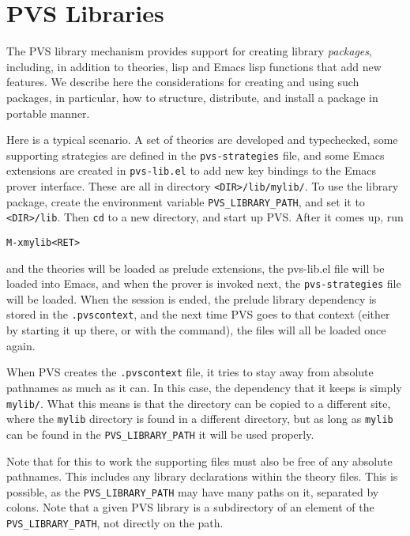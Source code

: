 \chapter{PVS Libraries}

The PVS library mechanism provides support for creating library
\emph{packages}, including, in addition to theories, lisp and Emacs lisp
functions that add new features.  We describe here the considerations for
creating and using such packages, in particular, how to structure, 
distribute, and install a package in portable manner.

Here is a typical scenario.  A set of theories are developed and
typechecked, some supporting strategies are defined in the
\texttt{pvs-strategies}
file, and some Emacs extensions are created in
\texttt{pvs-lib.el} to add new key
bindings to the Emacs prover interface.  These are all in directory
\texttt{<DIR>/lib/mylib/}.  To use the library package, create the
environment variable
\texttt{PVS\_LIBRARY\_PATH},
and set it to \texttt{<DIR>/lib}.  Then \texttt{cd} to a new directory,
and start up PVS.  After it comes up, run
\begin{alltt}
  M-x  mylib <RET>
\end{alltt}
and the theories will be loaded as prelude extensions, the pvs-lib.el file
will be loaded into Emacs, and when the prover is invoked next, the
\texttt{pvs-strategies} file will be loaded.  When the session is ended,
the prelude library dependency is stored in the \texttt{.pvscontext}, and
the next time PVS goes to that context (either by starting it up there, or
with the  command), the files will all be loaded once
again.

When PVS creates the \texttt{.pvscontext} file, it tries to stay away from
absolute pathnames as much as it can.  In this case, the dependency that
it keeps is simply \texttt{mylib/}.  What this means is that the directory
can be copied to a different site, where the \texttt{mylib} directory is
found in a different directory, but as long as \texttt{mylib} can be found
in the \texttt{PVS\_LIBRARY\_PATH} it will be used properly.

Note that for this to work the supporting files must also be free of any
absolute pathnames.  This includes any library declarations within the
theory files.  This is possible, as the
\texttt{PVS\_LIBRARY\_PATH}
may have many paths on it, separated by colons.  Note that a given PVS
library is a subdirectory of an element of the
\texttt{PVS\_LIBRARY\_PATH}, not directly on the path.

